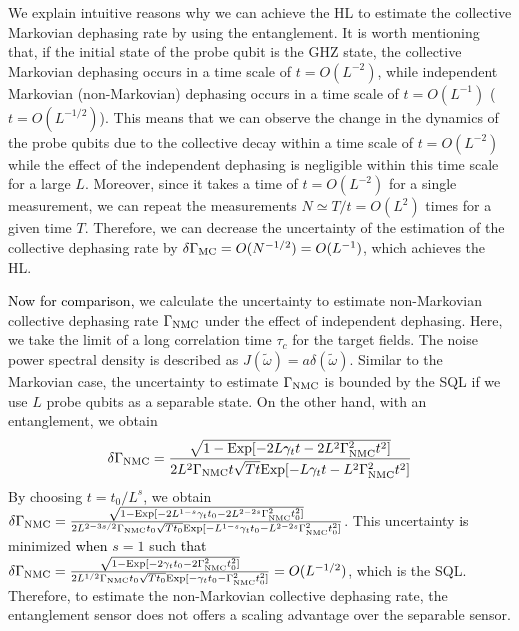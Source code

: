 \documentclass[prl,twocolumn,superscriptaddress]{revtex4}
\begin{document}
 We explain intuitive reasons why we can achieve the HL
 to estimate the collective Markovian dephasing rate by using the entanglement. It is worth
 mentioning that, if the initial state of the probe qubit is the GHZ
 state,
 the collective Markovian dephasing occurs in a time scale of
 $t=O(L^{-2})$, while independent Markovian (non-Markovian) dephasing
 occurs in a time scale of  $t=O(L^{-1})$ ($t=O(L^{-1/2})$). 
 This means that we can observe the change in the dynamics
 of the probe qubits due to the collective decay within a time scale of
 $t=O(L^{-2})$ while the effect of the independent dephasing
 is negligible within this time scale for a large $L$. Moreover, since
 it takes a time of  $t=O(L^{-2})$ for a single measurement, we can
 repeat the measurements $N\simeq T/t=O(L^2)$ times for a given time
 $T$. Therefore, we can decrease the uncertainty of the estimation of
 the collective dephasing rate by $\delta \Gamma _{\rm{MC}}=O(N^{-1/2})=O(L^{-1})$,
 which achieves the HL.

\textcolor{black}{Now for comparison,}
we calculate the uncertainty to estimate non-Markovian collective
dephasing rate
$\Gamma_{\rm{NMC}}$ under the effect of independent dephasing.
Here, we take the limit of a long correlation time $\tau _c$ for the
target fields. The noise  power spectral
density is described as $J(\tilde{\omega })=  a\delta (\tilde{\omega } )$.
Similar to the Markovian case,
the uncertainty to estimate
 $\Gamma_{\rm{NMC}}$ is bounded by the SQL
 if we use $L$ probe qubits as a separable
 state.
On the other hand,
with an entanglement,
we obtain
\begin{eqnarray}
 \delta \Gamma _{\rm{NMC}}=\frac{\sqrt{1- {\rm{Exp}}[-2L\gamma _tt-2L^2\Gamma_{\rm{NMC}}^2t^2
 ]}}{2L^2\Gamma _{\rm{NMC}}t\sqrt{Tt}{\rm{Exp}}[-L\gamma _tt-L^2\Gamma _{\rm{NMC}}^2t^2 ]}
\end{eqnarray}
  By choosing $t=t_0 /L^s$, we obtain $\delta \Gamma _{\rm{NMC}}=\frac{\sqrt{1- {\rm{Exp}}[-2L^{1-s}\gamma _tt_0-2L^{2-2s}\Gamma_{\rm{NMC}}^2t^2_0
 ]}}{2L^{2-3s/2}\Gamma
 _{\rm{NMC}}t_0\sqrt{Tt_0}{\rm{Exp}}[-L^{1-s}\gamma _tt_0-L^{2-2s}\Gamma
 _{\rm{NMC}}^2t_0^2 ]}$.
 This uncertainty \textcolor{black}{is}
 minimized
 \textcolor{black}{when}
 $s=1$ such
 \textcolor{black}{that}
 $\delta \Gamma _{\rm{NMC}}=\frac{\sqrt{1- {\rm{Exp}}[-2\gamma _tt_0-2\Gamma_{\rm{NMC}}^2t^2_0
 ]}}{2L^{1/2}\Gamma
 _{\rm{NMC}}t_0\sqrt{Tt_0}{\rm{Exp}}[-\gamma _tt_0-\Gamma
 _{\rm{NMC}}^2t_0^2 ]}=O(L^{-1/2})$, which is the SQL.
 Therefore, to estimate the non-Markovian
 collective dephasing rate, the entanglement sensor does not offers a
 scaling advantage over the separable sensor.
\end{document}
